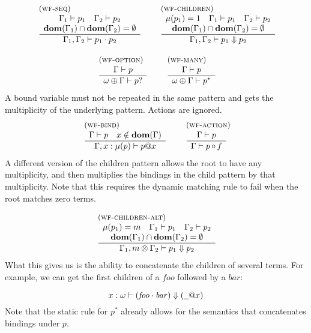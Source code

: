 \documentclass{article}
\makeatletter
\newcommand{\rulename}{\textsc}
\newcommand{\irule}[3]{\begin{array}{l}{~\small\mbox{(\rulename{#1})}}\\\;\frac{\begin{array}{c}#2\end{array}}{\begin{array}{l}#3\end{array}}\end{array}}
\newcommand{\wfp}[2]{\ensuremath{#1 \vdash #2}}
\newcommand{\pseq}[2]{\ensuremath{#1 \cdot #2}}
\newcommand{\children}[2]{\ensuremath{#1} \Downarrow #2}
\newcommand{\maybe}[1]{\ensuremath{#1?}}
\newcommand{\many}[1]{\ensuremath{#1^*}}
\newcommand{\any}{\ensuremath{\text{\underline{\hspace{0.6em}}}}}
\newcommand{\bind}[2]{\ensuremath{#1@#2}}
\newcommand{\paction}[2]{\ensuremath{#1\mathop{\circ} #2}}
\makeatother
\begin{document}
\[
  \begin{array}{c}
    \irule{wf-seq}{
    \wfp{\Gamma_1}{p_1}\quad
    \wfp{\Gamma_2}{p_2}\\
    \mathbf{dom}(\Gamma_1) \cap \mathbf{dom}(\Gamma_2) = \emptyset
    }{
    \wfp{\Gamma_1, \Gamma_2}{\pseq{p_1}{p_2}}
    }
    \quad
    \irule{wf-children}{
    \mu(p_1) = 1
    \quad
    \wfp{\Gamma_1}{p_1}
    \quad
    \wfp{\Gamma_2}{p_2}\\
    \mathbf{dom}(\Gamma_1) \cap \mathbf{dom}(\Gamma_2) = \emptyset
    }{
    \wfp{\Gamma_1, \Gamma_2}{\children{p_1}{p_2}}
    }
    \\\\
    \irule{wf-option}{
    \wfp{\Gamma}{p}
    }{
    \wfp{\omega \oplus \Gamma}{\maybe{p}}
    }
    \quad
    \irule{wf-many}{
    \wfp{\Gamma}{p}
    }{
    \wfp{\omega \oplus \Gamma}{\many{p}}
    }
  \end{array}
\]
%
A bound variable must not be repeated in the same pattern and gets
the multiplicity of the underlying pattern. Actions are ignored.
\[
  \begin{array}{c}
    \irule{wf-bind}{
    \wfp{\Gamma}{p}
    \quad
    x \notin{\mathbf{dom}(\Gamma)}
    }{
    \wfp{\Gamma, x : \mu(p)}{\bind{p}{x}}
    }
    \quad
    \irule{wf-action}{
    \wfp{\Gamma}{p}
    }{
    \wfp{\Gamma}{\paction{p}{f}}
    }
  \end{array}
\]
%
A different version of the children pattern allows the root to
have any multiplicity, and then multiplies the bindings in the
child pattern by that multiplicity. Note that this requires the
dynamic matching rule to fail when the root matches zero terms.

\[
  \begin{array}{c}
    \irule{wf-children-alt}{
    \mu(p_1) = m
    \quad
    \wfp{\Gamma_1}{p_1}
    \quad
    \wfp{\Gamma_2}{p_2}\\
    \mathbf{dom}(\Gamma_1) \cap \mathbf{dom}(\Gamma_2) = \emptyset
    }{
    \wfp{\Gamma_1, m \otimes \Gamma_2}{\children{p_1}{p_2}}
    }
  \end{array}
\]
%
What this gives us is the ability to concatenate the children of
several terms. For example, we can get the first children of a
$\mathit{foo}$ followed by a $\mathit{bar}$:

\[
  \wfp{x : \omega}{\children{(\pseq{\mathit{foo}}{\mathit{bar}})}{(\bind{\any}{x})}}
\]
%
Note that the static rule for \many{p} already allows for the
semantics that concatenates bindings under $p$.
\end{document}
